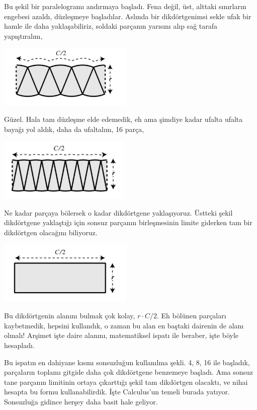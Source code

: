 \documentclass[12pt,fleqn]{article}\usepackage{../../common}
\begin{document}
Bu şekil bir paralelogramı andırmaya başladı. Fena değil, üst, alttaki
sınırların engebesi azaldı, düzleşmeye başladılar. Aslında bir
dikdörtgenimsi sekle ufak bir hamle ile daha yaklaşabiliriz, soldaki
parçanın yarısını alıp sağ tarafa yapıştıralım,

\includegraphics[height=3cm]{circ_5.png}

Güzel. Hala tam düzleşme elde edemedik, eh ama şimdiye kadar ufalta ufalta
bayağı yol aldık, daha da ufaltalım, 16 parça,

\includegraphics[height=3cm]{circ_6.png}

Ne kadar parçaya bölersek o kadar dikdörtgene yaklaşıyoruz. Üstteki şekil
dikdörtgene yaklaştığı için sonsuz parçanın birleşmesinin limite giderken
tam bir dikdörtgen olacağını biliyoruz. 

\includegraphics[height=3cm]{circ_7.png}

Bu dikdörtgenin alanını bulmak çok kolay, $r \cdot C/2$. Eh bölünen
parçaları kaybetmedik, hepsini kullandık, o zaman bu alan en baştaki
dairenin de alanı olmalı! Arşimet işte daire alanını, matematiksel ispatı
ile beraber, işte böyle hesapladı.

Bu ispatın en dahiyane kısmı sonsuzluğun kullanılma şekli. 4, 8, 16 ile
başladık, parçaların toplamı gitgide daha çok dikdörtgene benzemeye
başladı. Ama sonsuz tane parçanın limitinin ortaya çıkarttığı şekil tam
dikdörtgen olacaktı, ve nihai hesapta bu formu kullanabilirdik. İşte
Calculus'un temeli burada yatıyor. Sonsuzluğa gidince herşey daha basit
hale geliyor.
\end{document}
